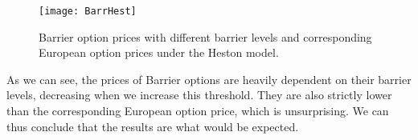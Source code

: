 \begin{figure}[H]
    \centering
      \texttt{[image: BarrHest]}
      \caption{Barrier option prices with different barrier levels and corresponding European option prices under the Heston model.}\label{fig:BarrHest}
    \end{figure}

As we can see, the prices of Barrier options are heavily dependent on their barrier levels, decreasing when we increase this threshold. They are also strictly lower than the corresponding European option price, which is unsurprising. We can thus conclude that the results are what would be expected.